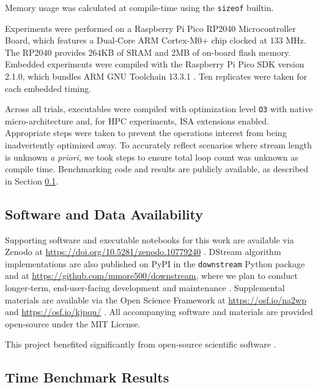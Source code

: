 Memory usage was calculated at compile-time using the \texttt{sizeof} builtin.

Experiments were performed on a Raspberry Pi Pico RP2040 Microcontroller Board, which features a Dual-Core ARM Cortex-M0+ chip clocked at 133 MHz.
The RP2040 provides 264KB of SRAM and 2MB of on-board flash memory.
Embedded experiments were compiled with the Raspberry Pi Pico SDK version 2.1.0, which bundles ARM GNU Toolchain 13.3.1 \citep{raspberrypipico2024}.
Ten replicates were taken for each embedded timing.

Across all trials, executables were compiled with optimization level \texttt{O3} with native micro-architecture and, for HPC experiments, ISA extensions enabled.
Appropriate steps were taken to prevent the operations interest from being inadvertently optimized away.
To accurately reflect scenarios where stream length is unknown \textit{a priori}, we took steps to ensure total loop count was unknown as compile time.
Benchmarking code and results are publicly available, as described in Section \ref{sec:materials}.

\subsection{Software and Data Availability}
\label{sec:materials}

Supporting software and executable notebooks for this work are available via Zenodo at \url{https://doi.org/10.5281/zenodo.10779240} \citep{moreno2024hsurf}.
DStream algorithm implementations are also published on PyPI in the \texttt{downstream} Python package and at \url{https://github.com/mmore500/downstream}, where we plan to conduct longer-term, end-user-facing development and maintenance \citep{moreno2024downstream}.
Supplemental materials are available via the Open Science Framework at \url{https://osf.io/na2wp} and \url{https://osf.io/kjpqu/} \citep{foster2017open}.
All accompanying software and materials are provided open-source under the MIT License.

This project benefited significantly from open-source scientific software \citep{2020SciPy-NMeth,harris2020array,reback2020pandas,mckinney-proc-scipy-2010,waskom2021seaborn,hunter2007matplotlib,moreno2023teeplot}.


\subsection{Time Benchmark Results}

